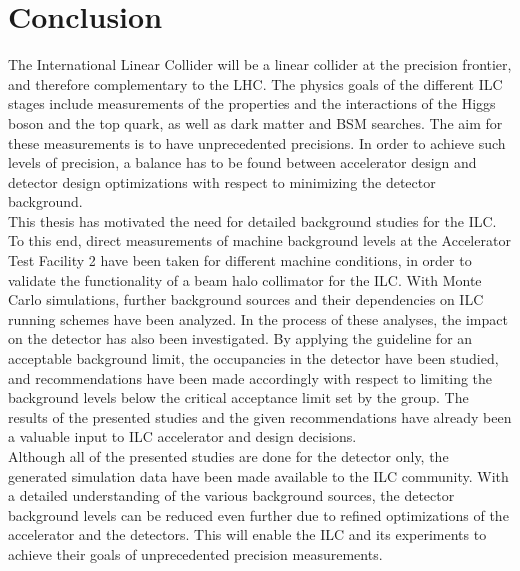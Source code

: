\chapter{Conclusion}
\label{Conclusion}
The International Linear Collider will be a linear \positron\electron collider at the precision frontier, and therefore complementary to the LHC.
The physics goals of the different ILC stages include measurements of the properties and the interactions of the Higgs boson and the top quark, as well as dark matter and BSM searches.
The aim for these measurements is to have unprecedented precisions.
In order to achieve such levels of precision, a balance has to be found between accelerator design and detector design optimizations with respect to minimizing the detector background.
\\This thesis has motivated the need for detailed background studies for the ILC.
To this end, direct measurements of machine background levels at the Accelerator Test Facility 2 have been taken for different machine conditions, in order to validate the functionality of a beam halo collimator for the ILC.
With Monte Carlo simulations, further background sources and their dependencies on ILC running schemes have been analyzed.
In the process of these analyses, the impact on the \sid detector has also been investigated.
By applying the \sid guideline for an acceptable background limit, the occupancies in the detector have been studied, and recommendations have been made accordingly with respect to limiting the background levels below the critical acceptance limit set by the \sid group.
The results of the presented studies and the given recommendations have already been a valuable input to ILC accelerator and \sid design decisions.
\\Although all of the presented studies are done for the \sid detector only, the generated simulation data have been made available to the ILC community.
With a detailed understanding of the various background sources, the detector background levels can be reduced even further due to refined optimizations of the accelerator and the detectors.
This will enable the ILC and its experiments to achieve their goals of unprecedented precision measurements.